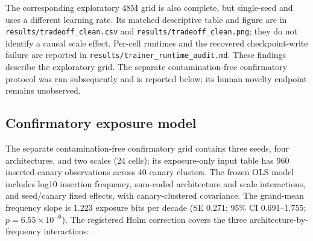 \documentclass[conference]{IEEEtran}
\begin{document}
The corresponding exploratory 48M grid is also complete, but single-seed and uses a different learning rate.
Its matched descriptive table and figure are in \texttt{results/tradeoff\_clean.csv} and
\texttt{results/tradeoff\_clean.png}; they do not identify a causal scale effect. Per-cell runtimes and the
recovered checkpoint-write failure are reported in \texttt{results/trainer\_runtime\_audit.md}. These findings
describe the exploratory grid. The separate contamination-free confirmatory protocol was run subsequently and is
reported below; its human novelty endpoint remains unobserved.

\subsection{Confirmatory exposure model}
The separate contamination-free confirmatory grid contains three seeds, four architectures, and two scales (24
cells); its exposure-only input table has 960 inserted-canary observations across 40 canary clusters. The frozen
OLS model includes log10 insertion frequency, sum-coded architecture and scale interactions, and seed/canary
fixed effects, with canary-clustered covariance. The grand-mean frequency slope is 1.223 exposure bits per decade
(SE 0.271; 95\% CI 0.691--1.755; $p=6.55\times10^{-6}$). The registered Holm correction covers the three
architecture-by-frequency interactions:

\begin{table}[t]
\centering
\caption{Frozen confirmatory exposure-model coefficients.}
\label{tab:confirmatory-exposure}
\end{table}
\end{document}
